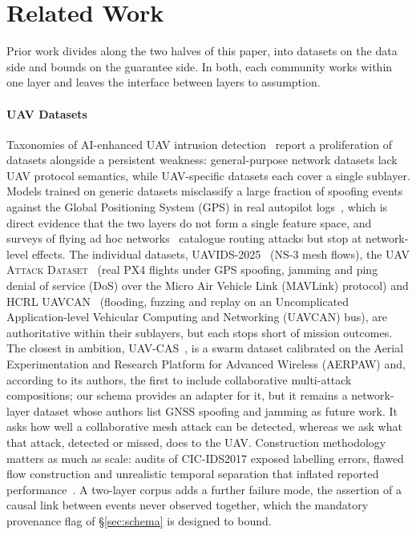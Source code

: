 \documentclass[conference,letterpaper,10pt]{IEEEtran}   %
\newcommand{\dataset}[1]{\textsc{#1}}
\begin{document}
\section{Related Work}
\label{sec:related}



Prior work divides along the two halves of this paper, into datasets on the data
side and bounds on the guarantee side. In both, each community works within one
layer and leaves the interface between layers to assumption.

\paragraph{UAV Datasets}
Taxonomies of AI-enhanced UAV intrusion detection~\cite{islam2025uavids} report
a proliferation of datasets alongside a persistent weakness: general-purpose
network datasets lack UAV protocol semantics, while UAV-specific datasets each
cover a single sublayer. Models trained on generic datasets misclassify a
large fraction of spoofing events against the Global Positioning System (GPS) in
real autopilot logs~\cite{islam2025uavids}, which is direct evidence that the
two layers do not form a single feature space, and surveys of flying ad hoc
networks~\cite{tsao2022survey,ceviz2024survey} catalogue routing attacks but stop
at network-level effects. The individual datasets, \dataset{UAVIDS-2025}~\cite{uavids2025}
(NS-3 mesh flows), the \dataset{UAV Attack
Dataset}~\cite{whelan2020uav,whelan2020novelty} (real PX4 flights under GPS
spoofing, jamming and ping denial of service (DoS) over the Micro Air Vehicle
Link (MAVLink) protocol) and \dataset{HCRL
UAVCAN}~\cite{hcrl_uavcan} (flooding, fuzzing and replay on an Uncomplicated
Application-level Vehicular Computing and Networking (UAVCAN) bus), are
authoritative within their sublayers, but each stops short of mission outcomes.
The closest in ambition, \dataset{UAV-CAS}~\cite{uavcas2026}, is a swarm dataset
calibrated on the Aerial Experimentation and Research Platform for Advanced
Wireless (AERPAW) and, according to its authors, the first to include
collaborative multi-attack compositions; our schema provides an adapter for it,
but it remains a network-layer dataset whose authors list GNSS spoofing and
jamming as future work. It asks
how well a collaborative mesh attack can be detected, whereas we ask what that
attack, detected or missed, does to the UAV. Construction methodology
matters as much as scale: audits of CIC-IDS2017 exposed labelling errors,
flawed flow construction and unrealistic temporal separation that inflated
reported performance~\cite{engelen2021troubleshooting,sharafaldin2018cicids}. A
two-layer corpus adds a further failure mode, the assertion of a causal link
between events never observed together, which the mandatory provenance flag of
\S\ref{sec:schema} is designed to bound.
\end{document}
